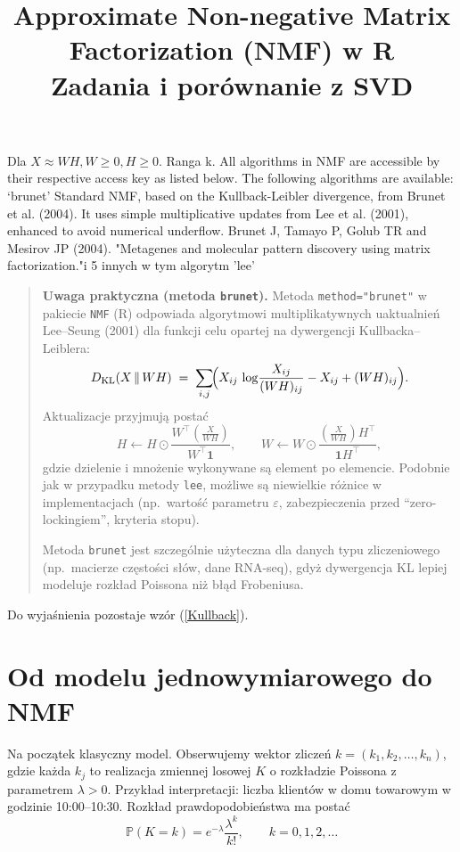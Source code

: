 \documentclass[12pt]{article}
\title{Approximate Non-negative Matrix Factorization (NMF) w R\\
\large Zadania i porównanie z SVD}
\author{}
\date{}
\begin{document}
Dla
$X \approx W H, W \geq 0, H\geq 0.$ Ranga k. 
All algorithms in NMF are accessible by their respective access key as listed below. The following algorithms are available:
‘brunet’
Standard NMF, based on the Kullback-Leibler divergence, from Brunet et al. (2004). It uses simple multiplicative updates from Lee et al. (2001), enhanced to avoid numerical underflow.
Brunet J, Tamayo P, Golub TR and Mesirov JP (2004). "Metagenes and molecular pattern discovery using matrix factorization."i 5 innych w tym algorytm 'lee'

\begin{quote}
\textbf{Uwaga praktyczna (metoda \texttt{brunet}).}  
Metoda \texttt{method="brunet"} w pakiecie \texttt{NMF} (R) odpowiada
algorytmowi multiplikatywnych uaktualnień Lee--Seung (2001) dla
funkcji celu opartej na dywergencji Kullbacka--Leiblera:
\begin{equation}
\label{Kullback}
  D_{\mathrm{KL}}(X \,\|\, WH) \;=\; 
  \sum_{i,j}\!\Bigl(X_{ij}\,\log\!\frac{X_{ij}}{(WH)_{ij}} - X_{ij} + (WH)_{ij}\Bigr).
\end{equation}
Aktualizacje przyjmują postać
\[
  H \leftarrow H \odot 
  \frac{W^\top \!\left(\tfrac{X}{WH}\right)}{W^\top \mathbf{1}}, 
  \qquad
  W \leftarrow W \odot 
  \frac{\left(\tfrac{X}{WH}\right) H^\top}{\mathbf{1} H^\top},
\]
gdzie dzielenie i mnożenie wykonywane są element po elemencie.
Podobnie jak w przypadku metody \texttt{lee}, możliwe są niewielkie różnice
w implementacjach (np.~wartość parametru $\varepsilon$, zabezpieczenia
przed ``zero-lockingiem'', kryteria stopu).  

Metoda \texttt{brunet} jest szczególnie użyteczna dla danych typu
zliczeniowego (np.~macierze częstości słów, dane RNA-seq), gdyż
dywergencja KL lepiej modeluje rozkład Poissona niż błąd Frobeniusa.
\end{quote}
Do wyjaśnienia pozostaje wzór (\ref{Kullback}). \section*{Od modelu jednowymiarowego do NMF}

Na początek klasyczny model. Obserwujemy wektor zliczeń
$k=(k_1,k_2,\ldots,k_n)$, gdzie każda  $k_j$ to realizacja zmiennej losowej $K$   o rozkładzie
Poissona z parametrem $\lambda>0$. Przykład interpretacji:
liczba klientów w domu towarowym w godzinie 10:00--10:30.
Rozkład prawdopodobieństwa ma postać
\[
\mathbb{P}(K=k)=e^{-\lambda}\frac{\lambda^k}{k!},\qquad k=0,1,2,\ldots
\]
\end{document}
